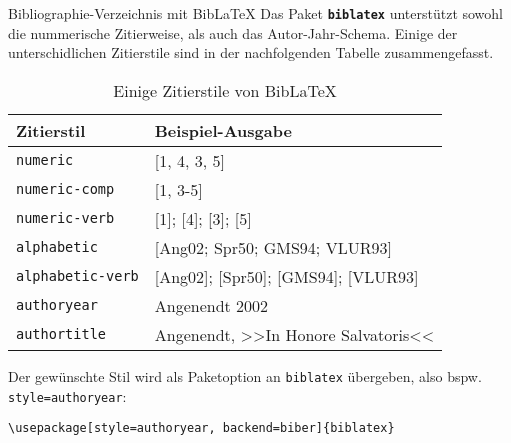 \begin{frame}[fragile]{Bibliographie-Verzeichnis mit Bib\LaTeX}
Das Paket \textbf{\texttt{biblatex}} unterstützt sowohl die nummerische Zitierweise, als auch das Autor-Jahr-Schema. Einige der unterschidlichen Zitierstile sind in der nachfolgenden Tabelle zusammengefasst. 
\begin{table}
	\caption{Einige Zitierstile von Bib\LaTeX}
\begin{tabular}{ll}
	\hline
	Zitierstil & Beispiel-Ausgabe \\
	\hline
	\texttt{numeric} & [1, 4, 3, 5] \\
	\texttt{numeric-comp} & [1, 3-5] \\
	\texttt{numeric-verb} & [1]; [4]; [3]; [5] \\
	\texttt{alphabetic} & [Ang02; Spr50; GMS94; VLUR93] \\
	\texttt{alphabetic-verb} & [Ang02]; [Spr50]; [GMS94]; [VLUR93] \\
	\texttt{authoryear} & Angenendt 2002 \\
	\texttt{authortitle} & Angenendt, >>In Honore Salvatoris<< \\
	\hline
\end{tabular}
\end{table}

Der gewünschte Stil wird als Paketoption an \texttt{biblatex} übergeben, also bspw. \texttt{style=authoryear}:
\begin{lstlisting}[style=tex]
\usepackage[style=authoryear, backend=biber]{biblatex}
\end{lstlisting}
\end{frame}

